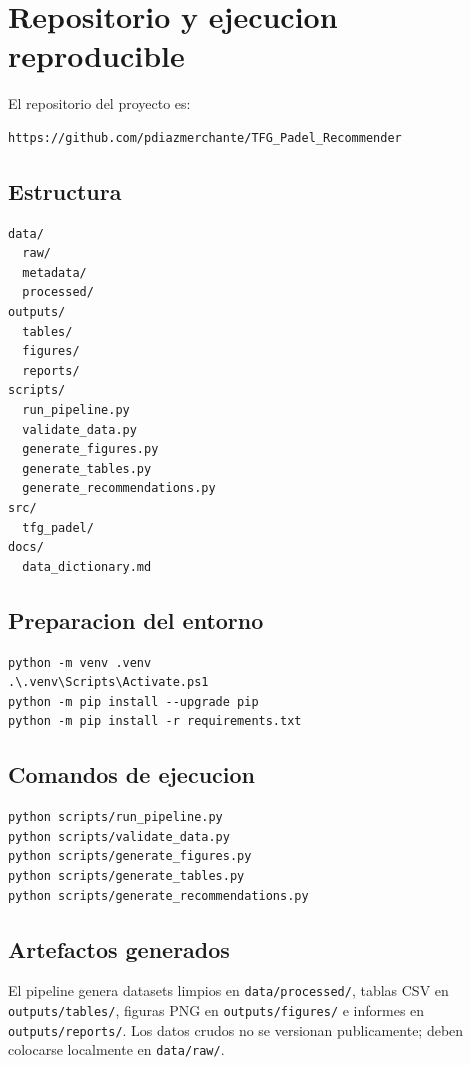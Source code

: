 \section{Repositorio y ejecucion reproducible}

El repositorio del proyecto es:

\begin{verbatim}
https://github.com/pdiazmerchante/TFG_Padel_Recommender
\end{verbatim}

\subsection{Estructura}

\begin{verbatim}
data/
  raw/
  metadata/
  processed/
outputs/
  tables/
  figures/
  reports/
scripts/
  run_pipeline.py
  validate_data.py
  generate_figures.py
  generate_tables.py
  generate_recommendations.py
src/
  tfg_padel/
docs/
  data_dictionary.md
\end{verbatim}

\subsection{Preparacion del entorno}

\begin{verbatim}
python -m venv .venv
.\.venv\Scripts\Activate.ps1
python -m pip install --upgrade pip
python -m pip install -r requirements.txt
\end{verbatim}

\subsection{Comandos de ejecucion}

\begin{verbatim}
python scripts/run_pipeline.py
python scripts/validate_data.py
python scripts/generate_figures.py
python scripts/generate_tables.py
python scripts/generate_recommendations.py
\end{verbatim}

\subsection{Artefactos generados}

El pipeline genera datasets limpios en \texttt{data/processed/}, tablas CSV en \texttt{outputs/tables/}, figuras PNG en \texttt{outputs/figures/} e informes en \texttt{outputs/reports/}. Los datos crudos no se versionan publicamente; deben colocarse localmente en \texttt{data/raw/}.

